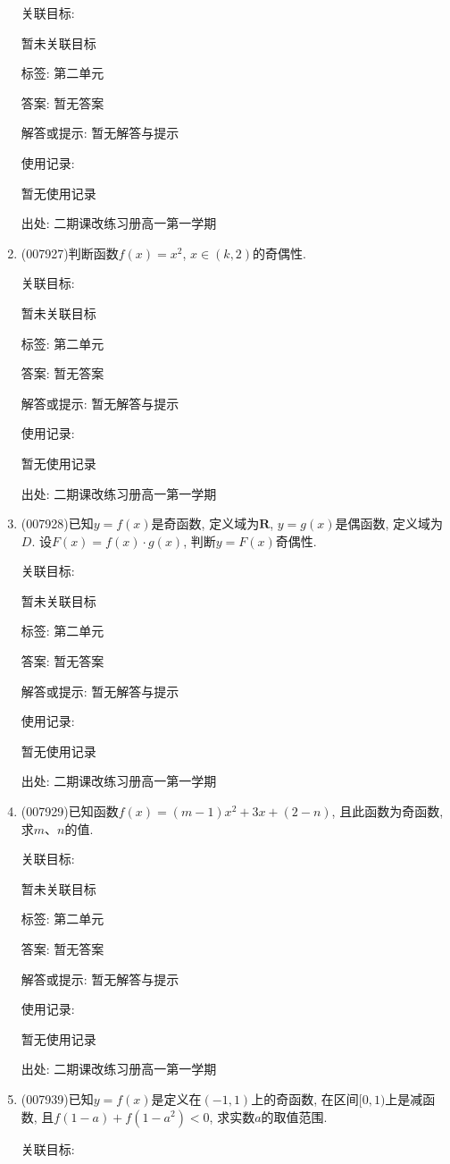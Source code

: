 \documentclass[10pt,a4paper]{article}
\begin{document}
\begin{enumerate}[1.]
关联目标:

暂未关联目标



标签: 第二单元

答案: 暂无答案

解答或提示: 暂无解答与提示

使用记录:

暂无使用记录


出处: 二期课改练习册高一第一学期
\item { (007927)}判断函数$f(x)=x^2$, $x\in (k,2)$的奇偶性.


关联目标:

暂未关联目标



标签: 第二单元

答案: 暂无答案

解答或提示: 暂无解答与提示

使用记录:

暂无使用记录


出处: 二期课改练习册高一第一学期
\item { (007928)}已知$y=f(x)$是奇函数, 定义域为$\mathbf{R}$, $y=g(x)$是偶函数, 定义域为$D$. 设$F(x)=f(x)\cdot g(x)$, 判断$y=F(x)$奇偶性.


关联目标:

暂未关联目标



标签: 第二单元

答案: 暂无答案

解答或提示: 暂无解答与提示

使用记录:

暂无使用记录


出处: 二期课改练习册高一第一学期
\item { (007929)}已知函数$f(x)=(m-1)x^2+3x+(2-n)$, 且此函数为奇函数, 求$m$、$n$的值.


关联目标:

暂未关联目标



标签: 第二单元

答案: 暂无答案

解答或提示: 暂无解答与提示

使用记录:

暂无使用记录


出处: 二期课改练习册高一第一学期
\item { (007939)}已知$y=f(x)$是定义在$(-1,1)$上的奇函数, 在区间$[0,1)$上是减函数, 且$f(1-a)+f(1-a^2)<0$, 求实数$a$的取值范围.


关联目标:


\end{enumerate}
\end{document}
